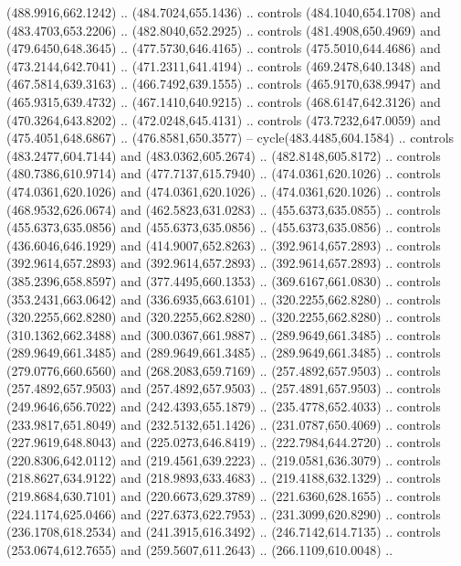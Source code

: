 \begin{scope}[shift={(-162.56685,-567.58888)}]
\begin{scope}
      (488.9916,662.1242) .. (484.7024,655.1436) .. controls (484.1040,654.1708) and
      (483.4703,653.2206) .. (482.8040,652.2925) .. controls (481.4908,650.4969) and
      (479.6450,648.3645) .. (477.5730,646.4165) .. controls (475.5010,644.4686) and
      (473.2144,642.7041) .. (471.2311,641.4194) .. controls (469.2478,640.1348) and
      (467.5814,639.3163) .. (466.7492,639.1555) .. controls (465.9170,638.9947) and
      (465.9315,639.4732) .. (467.1410,640.9215) .. controls (468.6147,642.3126) and
      (470.3264,643.8202) .. (472.0248,645.4131) .. controls (473.7232,647.0059) and
      (475.4051,648.6867) .. (476.8581,650.3577) -- cycle(483.4485,604.1584) ..
      controls (483.2477,604.7144) and (483.0362,605.2674) .. (482.8148,605.8172) ..
      controls (480.7386,610.9714) and (477.7137,615.7940) .. (474.0361,620.1026) ..
      controls (474.0361,620.1026) and (474.0361,620.1026) .. (474.0361,620.1026) ..
      controls (468.9532,626.0674) and (462.5823,631.0283) .. (455.6373,635.0855) ..
      controls (455.6373,635.0856) and (455.6373,635.0856) .. (455.6373,635.0856) ..
      controls (436.6046,646.1929) and (414.9007,652.8263) .. (392.9614,657.2893) ..
      controls (392.9614,657.2893) and (392.9614,657.2893) .. (392.9614,657.2893) ..
      controls (385.2396,658.8597) and (377.4495,660.1353) .. (369.6167,661.0830) ..
      controls (353.2431,663.0642) and (336.6935,663.6101) .. (320.2255,662.8280) ..
      controls (320.2255,662.8280) and (320.2255,662.8280) .. (320.2255,662.8280) ..
      controls (310.1362,662.3488) and (300.0367,661.9887) .. (289.9649,661.3485) ..
      controls (289.9649,661.3485) and (289.9649,661.3485) .. (289.9649,661.3485) ..
      controls (279.0776,660.6560) and (268.2083,659.7169) .. (257.4892,657.9503) ..
      controls (257.4892,657.9503) and (257.4892,657.9503) .. (257.4891,657.9503) ..
      controls (249.9646,656.7022) and (242.4393,655.1879) .. (235.4778,652.4033) ..
      controls (233.9817,651.8049) and (232.5132,651.1426) .. (231.0787,650.4069) ..
      controls (227.9619,648.8043) and (225.0273,646.8419) .. (222.7984,644.2720) ..
      controls (220.8306,642.0112) and (219.4561,639.2223) .. (219.0581,636.3079) ..
      controls (218.8627,634.9122) and (218.9893,633.4683) .. (219.4188,632.1329) ..
      controls (219.8684,630.7101) and (220.6673,629.3789) .. (221.6360,628.1655) ..
      controls (224.1174,625.0466) and (227.6373,622.7953) .. (231.3099,620.8290) ..
      controls (236.1708,618.2534) and (241.3915,616.3492) .. (246.7142,614.7135) ..
      controls (253.0674,612.7655) and (259.5607,611.2643) .. (266.1109,610.0048) ..

\end{scope}
\end{scope}

